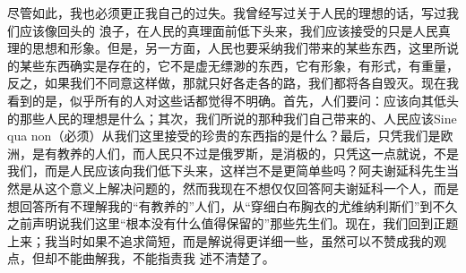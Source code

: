 \documentclass{article}
\begin{document}
尽管如此，我也必须更正我自己的过失。我曾经写过关于人民的理想的话，写过我们应该像回头的
\newpage
浪子，在人民的真理面前低下头来，我们应该接受的只是人民真理的思想和形象。但是，另一方面，人民也要采纳我们带来的某些东西，这里所说的某些东西确实是存在的，它不是虚无缥渺的东西，它有形象，有形式，有重量，反之，如果我们不同意这样做，那就只好各走各的路，我们都将各自毁灭。现在我看到的是，似乎所有的人对这些话都觉得不明确。首先，人们要问：应该向其低头的那些人民的理想是什么；其次，我们所说的那种我们自己带来的、人民应该Sine qua non（必须）从我们这里接受的珍贵的东西指的是什么？最后，只凭我们是欧洲，是有教养的人们，而人民只不过是俄罗斯，是消极的，只凭这一点就说，不是我们，而是人民应该向我们低下头来，这样岂不是更简单些吗？阿夫谢延科先生当然是从这个意义上解决问题的，然而我现在不想仅仅回答阿夫谢延科一个人，而是想回答所有不理解我的“有教养的”人们，从“穿细白布胸衣的尤维纳利斯们”到不久之前声明说我们这里“根本没有什么值得保留的”那些先生们。现在，我们回到正题上来；我当时如果不追求简短，而是解说得更详细一些，虽然可以不赞成我的观点，但却不能曲解我，不能指责我
\newpage
述不清楚了。
\end{document}
